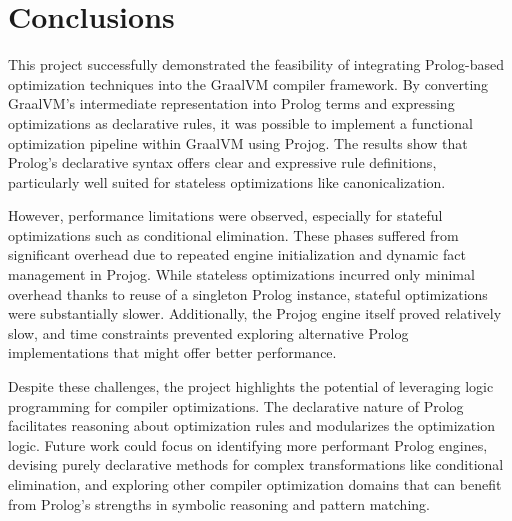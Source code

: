 \chapter[Conclusion]{Conclusions}
This project successfully demonstrated the feasibility of integrating Prolog-based optimization techniques into the GraalVM compiler framework. By converting GraalVM’s intermediate representation into Prolog terms and expressing optimizations as declarative rules, it was possible to implement a functional optimization pipeline within GraalVM using Projog. The results show that Prolog’s declarative syntax offers clear and expressive rule definitions, particularly well suited for stateless optimizations like canonicalization.

However, performance limitations were observed, especially for stateful optimizations such as conditional elimination. These phases suffered from significant overhead due to repeated engine initialization and dynamic fact management in Projog. While stateless optimizations incurred only minimal overhead thanks to reuse of a singleton Prolog instance, stateful optimizations were substantially slower. Additionally, the Projog engine itself proved relatively slow, and time constraints prevented exploring alternative Prolog implementations that might offer better performance.

Despite these challenges, the project highlights the potential of leveraging logic programming for compiler optimizations. The declarative nature of Prolog facilitates reasoning about optimization rules and modularizes the optimization logic. Future work could focus on identifying more performant Prolog engines, devising purely declarative methods for complex transformations like conditional elimination, and exploring other compiler optimization domains that can benefit from Prolog’s strengths in symbolic reasoning and pattern matching.


